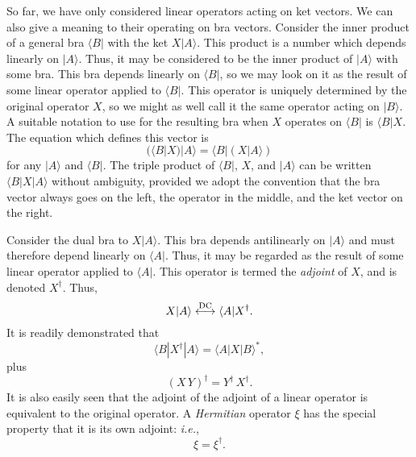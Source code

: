 So far, we have only considered linear operators acting on ket vectors. We can also
give a meaning to their operating on bra vectors. Consider the inner product
of a general bra $\langle B|$ with the ket $X|A\rangle$. This product is a
number which depends linearly on $|A\rangle$. Thus, it may be considered to
be the inner product of $|A\rangle$ with some bra. This bra depends linearly
on $\langle B|$, so we may look on it as the result of some linear
operator applied to $\langle B|$. This operator is uniquely determined by the
original operator $X$, so we might as well call it the same operator acting on
$|B\rangle$. A suitable notation to use for the resulting bra when $X$ operates on
$\langle B|$ is $\langle B|X$. The equation which defines this
vector is
\begin{equation}\label{e2.32}
(\langle B|X) |A\rangle = \langle B|( X|A\rangle)
\end{equation}
for any $|A\rangle$ and $\langle B|$. 
The triple product of $\langle B|$, $X$, and $|A\rangle$
can be written $\langle B|X| A \rangle$ without ambiguity, provided we adopt the
convention that the bra vector always goes on the left, the operator in the middle,
and the ket vector on the right. 

Consider the dual bra to $X|A\rangle$. This bra depends antilinearly on
$|A\rangle$ and must therefore depend linearly on $\langle A|$. 
Thus, it may 
be regarded as the result of some linear operator applied to $\langle A|$.
This operator is termed the {\em adjoint} of $X$, and is denoted $X^{\dag}$. Thus,
\begin{equation}\label{e2.33}
X | A\rangle \stackrel{\rm DC}{\longleftrightarrow} \langle A|X^{\dag}.
\end{equation}
It is readily demonstrated that
\begin{equation}
\langle B|X^{\dag}|A\rangle = \langle A|X |B\rangle^\ast,
\end{equation}
plus
\begin{equation}
(X\, Y)^{\dag} = Y^{\dag}\, X^{\dag}.
\end{equation}
It is also easily seen that the adjoint of the adjoint of a linear operator
is equivalent to the original operator. A {\em Hermitian} operator $\xi$ has
the special property that it is its own adjoint:  {\em i.e.},
\begin{equation}
\xi= \xi^{\dag}.
\end{equation}

